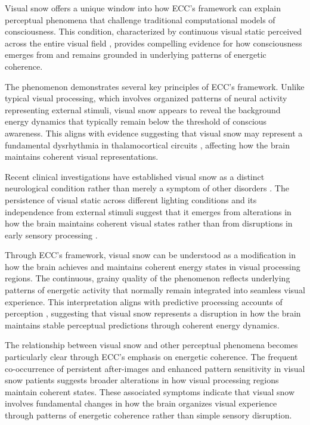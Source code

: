 \begin{refsection}
Visual snow offers a unique window into how ECC's framework can explain perceptual phenomena that challenge traditional computational models of consciousness. This condition, characterized by continuous visual static perceived across the entire visual field \cite{Puledda2020}, provides compelling evidence for how consciousness emerges from and remains grounded in underlying patterns of energetic coherence.

The phenomenon demonstrates several key principles of ECC's framework. Unlike typical visual processing, which involves organized patterns of neural activity representing external stimuli, visual snow appears to reveal the background energy dynamics that typically remain below the threshold of conscious awareness. This aligns with evidence suggesting that visual snow may represent a fundamental dysrhythmia in thalamocortical circuits \cite{Lauschke2016}, affecting how the brain maintains coherent visual representations.

Recent clinical investigations have established visual snow as a distinct neurological condition rather than merely a symptom of other disorders \cite{Schankin2014}. The persistence of visual static across different lighting conditions and its independence from external stimuli suggest that it emerges from alterations in how the brain maintains coherent visual states rather than from disruptions in early sensory processing \cite{Bessero2014}.

Through ECC's framework, visual snow can be understood as a modification in how the brain achieves and maintains coherent energy states in visual processing regions. The continuous, grainy quality of the phenomenon reflects underlying patterns of energetic activity that normally remain integrated into seamless visual experience. This interpretation aligns with predictive processing accounts of perception \cite{Clark2013}, suggesting that visual snow represents a disruption in how the brain maintains stable perceptual predictions through coherent energy dynamics.

The relationship between visual snow and other perceptual phenomena becomes particularly clear through ECC's emphasis on energetic coherence. The frequent co-occurrence of persistent after-images and enhanced pattern sensitivity in visual snow patients \cite{Puledda2020} suggests broader alterations in how visual processing regions maintain coherent states. These associated symptoms indicate that visual snow involves fundamental changes in how the brain organizes visual experience through patterns of energetic coherence rather than simple sensory disruption.


\end{refsection}
